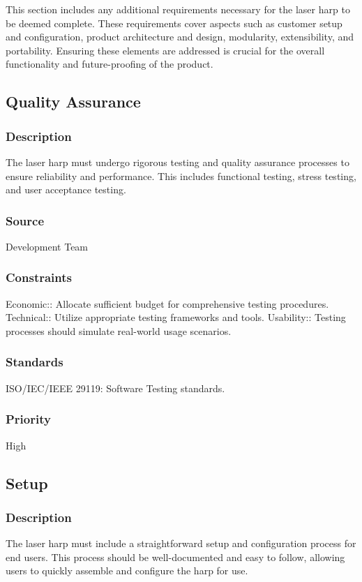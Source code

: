 This section includes any additional requirements necessary for the laser harp to be deemed complete. These requirements cover aspects such as customer setup and configuration, product architecture and design, modularity, extensibility, and portability. Ensuring these elements are addressed is crucial for the overall functionality and future-proofing of the product.


\subsection{Quality Assurance}
\subsubsection{Description}
The laser harp must undergo rigorous testing and quality assurance processes to ensure reliability and performance. This includes functional testing, stress testing, and user acceptance testing.
\subsubsection{Source}
Development Team
\subsubsection{Constraints}
Economic:: Allocate sufficient budget for comprehensive testing procedures.
Technical:: Utilize appropriate testing frameworks and tools.
Usability:: Testing processes should simulate real-world usage scenarios.
\subsubsection{Standards}
ISO/IEC/IEEE 29119: Software Testing standards.
\subsubsection{Priority}
High


\subsection{Setup}
\subsubsection{Description}
The laser harp must include a straightforward setup and configuration process for end users. This process should be well-documented and easy to follow, allowing users to quickly assemble and configure the harp for use.
